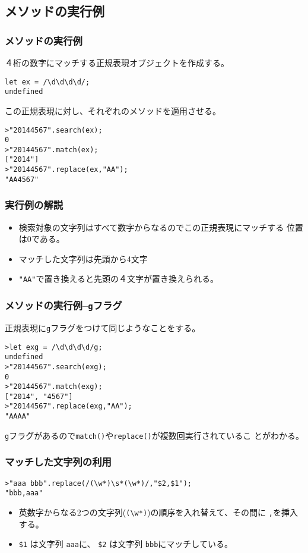 \subsection{メソッドの実行例}
\begin{frame}[containsverbatim]
 \frametitle{メソッドの実行例}
４桁の数字にマッチする正規表現オブジェクトを作成する。
\begin{Verbatim}
let ex = /\d\d\d\d/;
undefined
\end{Verbatim}
この正規表現に対し、それぞれのメソッドを適用させる。
\begin{Verbatim}
>"20144567".search(ex);
0
>"20144567".match(ex);
["2014"]
>"20144567".replace(ex,"AA");
"AA4567"
\end{Verbatim}
\end{frame}
\begin{frame}[containsverbatim]
 \frametitle{実行例の解説}
\begin{itemize}
 \item 検索対象の文字列はすべて数字からなるのでこの正規表現にマッチする
       位置は$0$である。
 \item マッチした文字列は先頭から4文字
 \item \Verb+"AA"+で置き換えると先頭の４文字が置き換えられる。
\end{itemize}
\end{frame}
\begin{frame}[containsverbatim]
 \frametitle{メソッドの実行例--\protect\texttt{g}フラグ}
正規表現に\Verb+g+フラグをつけて同じようなことをする。
\begin{Verbatim}
>let exg = /\d\d\d\d/g;
undefined
>"20144567".search(exg);
0
>"20144567".match(exg);
["2014", "4567"]
>"20144567".replace(exg,"AA");
"AAAA"
\end{Verbatim}
\Verb+g+フラグがあるので\Verb+match()+や\Verb+replace()+が複数回実行されているこ
 とがわかる。
\end{frame}
\begin{frame}[containsverbatim]
 \frametitle{マッチした文字列の利用}
\begin{Verbatim}
>"aaa bbb".replace(/(\w*)\s*(\w*)/,"$2,$1");
"bbb,aaa"
\end{Verbatim}
\begin{itemize}
 \item 英数字からなる2つの文字列(\Verb+(\w*)+)の順序を入れ替えて、その間に
 \Verb+,+を挿入する。
 \item \Verb+$1+ は文字列 \Verb+aaa+に、
\Verb+$2+ は文字列 \Verb+bbb+にマッチしている。
\end{itemize}
\end{frame}
